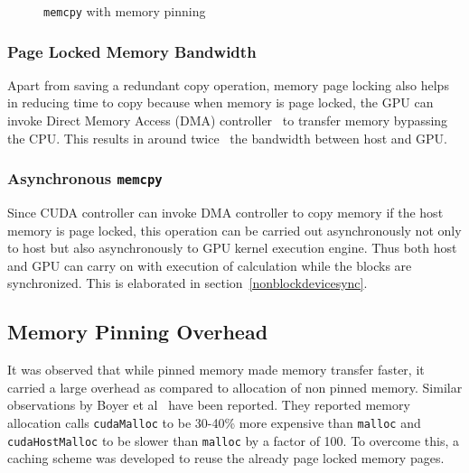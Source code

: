 \begin{figure}[h] %
  \caption{\texttt{memcpy} with memory pinning}\label{fig:w_mem_pin}
\end{figure}

\subsubsection{Page Locked Memory Bandwidth}
Apart from saving a redundant copy operation, memory page locking also helps in
reducing time to copy because when memory is page locked, the GPU can invoke Direct
Memory Access (DMA)
controller~\cite{dmatransfer}\cite{whypinnedfast}\cite{teslaspecs}\cite{teslakspecs}
to transfer memory bypassing the CPU. This results in around
twice~\cite{datatransferoptimization} the bandwidth between host and GPU.

\subsubsection{Asynchronous \texttt{memcpy}}
Since CUDA controller can invoke DMA controller to copy memory if the host memory
is page locked, this operation can be carried out asynchronously not only to host but
also asynchronously to GPU kernel execution engine. Thus both host and GPU can carry
on with execution of calculation while the blocks are synchronized. This is
elaborated in section~\ref{nonblockdevicesync}.

\subsection{Memory Pinning Overhead}
It was observed that while pinned memory made memory transfer faster, it carried
a large overhead as compared to allocation of non pinned memory. Similar observations
by Boyer et al~\cite{Boyer2009}\cite{memory-management-overhead}\cite{pinned-tradeoff}
have been reported. They reported memory allocation calls \texttt{cudaMalloc} to
be 30-40\% more expensive than \texttt{malloc} and \texttt{cudaHostMalloc} to be
slower than \texttt{malloc} by a factor of 100. To overcome this, a caching scheme was
developed to reuse the already page locked memory pages.

